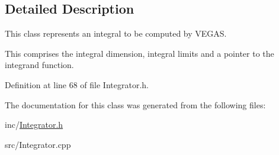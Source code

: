 \subsection{Detailed Description}
This class represents an integral to be computed by V\+E\+G\+A\+S. 

This comprises the integral dimension, integral limits and a pointer to the integrand function. 

Definition at line 68 of file Integrator.\+h.



The documentation for this class was generated from the following files\+:\begin{DoxyCompactItemize}
\item 
inc/\hyperlink{Integrator_8h}{Integrator.\+h}\item 
src/Integrator.\+cpp\end{DoxyCompactItemize}
